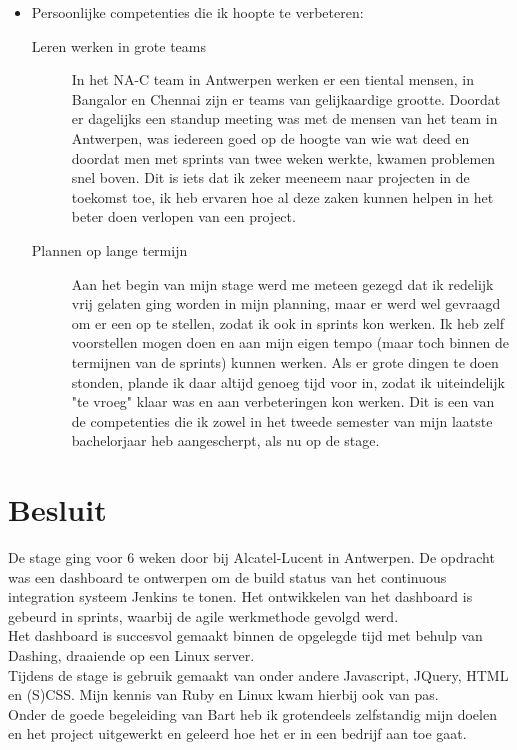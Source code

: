 \documentclass[10pt,a4paper]{article}
\begin{document}
\begin{itemize}
\begin{description}
\end{description}
\item Persoonlijke competenties die ik hoopte te verbeteren:
\begin{description}
\item[Leren werken in grote teams] In het NA-C team in Antwerpen werken er een tiental mensen, in Bangalor en Chennai zijn er teams van gelijkaardige grootte. Doordat er dagelijks een standup meeting was met de mensen van het team in Antwerpen, was iedereen goed op de hoogte van wie wat deed en doordat men met sprints van twee weken werkte, kwamen problemen snel boven. Dit is iets dat ik zeker meeneem naar projecten in de toekomst toe, ik heb ervaren hoe al deze zaken kunnen helpen in het beter doen verlopen van een project.
\item[Plannen op lange termijn] Aan het begin van mijn stage werd me meteen gezegd dat ik redelijk vrij gelaten ging worden in mijn planning, maar er werd wel gevraagd om er een op te stellen, zodat ik ook in sprints kon werken. Ik heb zelf voorstellen mogen doen en aan mijn eigen tempo (maar toch binnen de termijnen van de sprints) kunnen werken. Als er grote dingen te doen stonden, plande ik daar altijd genoeg tijd voor in, zodat ik uiteindelijk "te vroeg" klaar was en aan verbeteringen kon werken. Dit is een van de competenties die ik zowel in het tweede semester van mijn laatste bachelorjaar heb aangescherpt, als nu op de stage.  
\end{description}
\end{itemize}

\section{Besluit}
\label{besluit}
De stage ging voor 6 weken door bij Alcatel-Lucent in Antwerpen. De opdracht was een dashboard te ontwerpen om de build status van het continuous integration systeem Jenkins te tonen. Het ontwikkelen van het dashboard is gebeurd in sprints, waarbij de agile werkmethode gevolgd werd.\\
Het dashboard is succesvol gemaakt binnen de opgelegde tijd met behulp van Dashing, draaiende op een Linux server.\\
Tijdens de stage is gebruik gemaakt van onder andere Javascript, JQuery, HTML en (S)CSS. Mijn kennis van Ruby en Linux kwam hierbij ook van pas.\\
Onder de goede begeleiding van Bart heb ik grotendeels zelfstandig mijn doelen en het project uitgewerkt en geleerd hoe het er in een bedrijf aan toe gaat.
\end{document}
